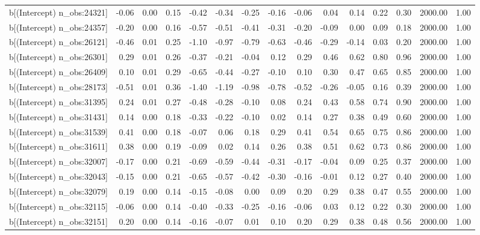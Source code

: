 \begin{table}[ht]
\begin{tabular}{rrrrrrrrrrrrrrr}
  b[(Intercept) n\_obs:24321] & -0.06 & 0.00 & 0.15 & -0.42 & -0.34 & -0.25 & -0.16 & -0.06 & 0.04 & 0.14 & 0.22 & 0.30 & 2000.00 & 1.00 \\ 
  b[(Intercept) n\_obs:24357] & -0.20 & 0.00 & 0.16 & -0.57 & -0.51 & -0.41 & -0.31 & -0.20 & -0.09 & 0.00 & 0.09 & 0.18 & 2000.00 & 1.00 \\ 
  b[(Intercept) n\_obs:26121] & -0.46 & 0.01 & 0.25 & -1.10 & -0.97 & -0.79 & -0.63 & -0.46 & -0.29 & -0.14 & 0.03 & 0.20 & 2000.00 & 1.00 \\ 
  b[(Intercept) n\_obs:26301] & 0.29 & 0.01 & 0.26 & -0.37 & -0.21 & -0.04 & 0.12 & 0.29 & 0.46 & 0.62 & 0.80 & 0.96 & 2000.00 & 1.00 \\ 
  b[(Intercept) n\_obs:26409] & 0.10 & 0.01 & 0.29 & -0.65 & -0.44 & -0.27 & -0.10 & 0.10 & 0.30 & 0.47 & 0.65 & 0.85 & 2000.00 & 1.00 \\ 
  b[(Intercept) n\_obs:28173] & -0.51 & 0.01 & 0.36 & -1.40 & -1.19 & -0.98 & -0.78 & -0.52 & -0.26 & -0.05 & 0.16 & 0.39 & 2000.00 & 1.00 \\ 
  b[(Intercept) n\_obs:31395] & 0.24 & 0.01 & 0.27 & -0.48 & -0.28 & -0.10 & 0.08 & 0.24 & 0.43 & 0.58 & 0.74 & 0.90 & 2000.00 & 1.00 \\ 
  b[(Intercept) n\_obs:31431] & 0.14 & 0.00 & 0.18 & -0.33 & -0.22 & -0.10 & 0.02 & 0.14 & 0.27 & 0.38 & 0.49 & 0.60 & 2000.00 & 1.00 \\ 
  b[(Intercept) n\_obs:31539] & 0.41 & 0.00 & 0.18 & -0.07 & 0.06 & 0.18 & 0.29 & 0.41 & 0.54 & 0.65 & 0.75 & 0.86 & 2000.00 & 1.00 \\ 
  b[(Intercept) n\_obs:31611] & 0.38 & 0.00 & 0.19 & -0.09 & 0.02 & 0.14 & 0.26 & 0.38 & 0.51 & 0.62 & 0.73 & 0.86 & 2000.00 & 1.00 \\ 
  b[(Intercept) n\_obs:32007] & -0.17 & 0.00 & 0.21 & -0.69 & -0.59 & -0.44 & -0.31 & -0.17 & -0.04 & 0.09 & 0.25 & 0.37 & 2000.00 & 1.00 \\ 
  b[(Intercept) n\_obs:32043] & -0.15 & 0.00 & 0.21 & -0.65 & -0.57 & -0.42 & -0.30 & -0.16 & -0.01 & 0.12 & 0.27 & 0.40 & 2000.00 & 1.00 \\ 
  b[(Intercept) n\_obs:32079] & 0.19 & 0.00 & 0.14 & -0.15 & -0.08 & 0.00 & 0.09 & 0.20 & 0.29 & 0.38 & 0.47 & 0.55 & 2000.00 & 1.00 \\ 
  b[(Intercept) n\_obs:32115] & -0.06 & 0.00 & 0.14 & -0.40 & -0.33 & -0.25 & -0.16 & -0.06 & 0.03 & 0.12 & 0.22 & 0.30 & 2000.00 & 1.00 \\ 
  b[(Intercept) n\_obs:32151] & 0.20 & 0.00 & 0.14 & -0.16 & -0.07 & 0.01 & 0.10 & 0.20 & 0.29 & 0.38 & 0.48 & 0.56 & 2000.00 & 1.00 \\ 

\end{tabular}
\end{table}
